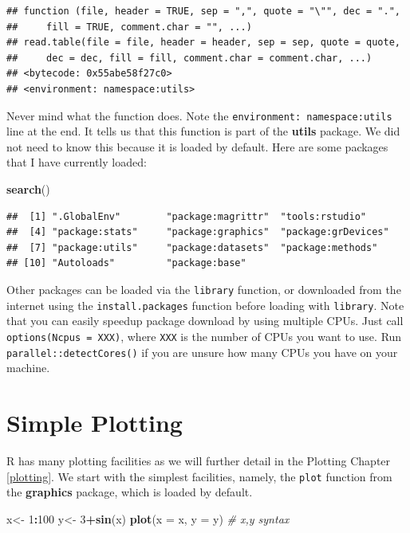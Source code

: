 \documentclass[]{book}
\newenvironment{Shaded}{\begin{snugshade}}{\end{snugshade}}
\newcommand{\CommentTok}[1]{\textcolor[rgb]{0.56,0.35,0.01}{\textit{#1}}}
\newcommand{\DataTypeTok}[1]{\textcolor[rgb]{0.13,0.29,0.53}{#1}}
\newcommand{\DecValTok}[1]{\textcolor[rgb]{0.00,0.00,0.81}{#1}}
\newcommand{\KeywordTok}[1]{\textcolor[rgb]{0.13,0.29,0.53}{\textbf{#1}}}
\newcommand{\NormalTok}[1]{#1}
\newcommand{\OperatorTok}[1]{\textcolor[rgb]{0.81,0.36,0.00}{\textbf{#1}}}
\newcommand{\StringTok}[1]{\textcolor[rgb]{0.31,0.60,0.02}{#1}}
\theoremstyle{definition}
\theoremstyle{definition}
\theoremstyle{definition}
\theoremstyle{remark}
\begin{document}
\begin{verbatim}
## function (file, header = TRUE, sep = ",", quote = "\"", dec = ".", 
##     fill = TRUE, comment.char = "", ...) 
## read.table(file = file, header = header, sep = sep, quote = quote, 
##     dec = dec, fill = fill, comment.char = comment.char, ...)
## <bytecode: 0x55abe58f27c0>
## <environment: namespace:utils>
\end{verbatim}

Never mind what the function does.
Note the \texttt{environment:\ namespace:utils} line at the end.
It tells us that this function is part of the \textbf{utils} package.
We did not need to know this because it is loaded by default.
Here are some packages that I have currently loaded:

\begin{Shaded}
\begin{Highlighting}[]
\KeywordTok{search}\NormalTok{()}
\end{Highlighting}
\end{Shaded}

\begin{verbatim}
##  [1] ".GlobalEnv"        "package:magrittr"  "tools:rstudio"    
##  [4] "package:stats"     "package:graphics"  "package:grDevices"
##  [7] "package:utils"     "package:datasets"  "package:methods"  
## [10] "Autoloads"         "package:base"
\end{verbatim}

Other packages can be loaded via the \texttt{library} function, or downloaded from the internet using the \texttt{install.packages} function before loading with \texttt{library}.
Note that you can easily speedup package download by using multiple CPUs.
Just call \texttt{options(Ncpus\ =\ XXX)}, where \texttt{XXX} is the number of CPUs you want to use.
Run \texttt{parallel::detectCores()} if you are unsure how many CPUs you have on your machine.

\hypertarget{simple-plotting}{%
\section{Simple Plotting}\label{simple-plotting}}

R has many plotting facilities as we will further detail in the Plotting Chapter \ref{plotting}.
We start with the simplest facilities, namely, the \texttt{plot} function from the \textbf{graphics} package, which is loaded by default.

\begin{Shaded}
\begin{Highlighting}[]
\NormalTok{x<-}\StringTok{ }\DecValTok{1}\OperatorTok{:}\DecValTok{100}
\NormalTok{y<-}\StringTok{ }\DecValTok{3}\OperatorTok{+}\KeywordTok{sin}\NormalTok{(x) }
\KeywordTok{plot}\NormalTok{(}\DataTypeTok{x =}\NormalTok{ x, }\DataTypeTok{y =}\NormalTok{ y) }\CommentTok{# x,y syntax                         }
\end{Highlighting}
\end{Shaded}
\end{document}

